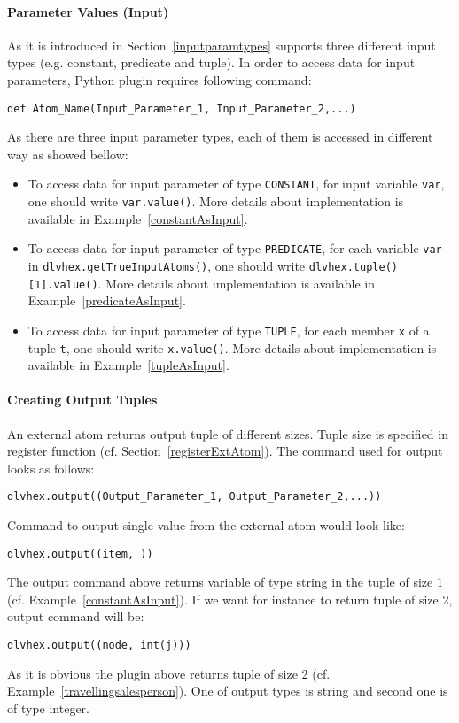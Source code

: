 \documentclass[a4paper, titlepage]{article}
\begin{document}
\paragraph{Parameter Values (Input)} As it is introduced in Section~\ref{inputparamtypes} \dlvhex{} supports three different input types (e.g. constant, predicate and tuple). In order to access data for input parameters, Python plugin requires following command:  
\begin{verbatim}
def Atom_Name(Input_Parameter_1, Input_Parameter_2,...)
\end{verbatim}
As there are three input parameter types, each of them is accessed in different way as showed bellow: 
\begin{itemize}
\item To access data for input parameter of type \verb+CONSTANT+, for input variable \verb+var+, one should write \verb+var.value()+. More details about implementation is available in Example~\ref{constantAsInput}.
 
\item To access data for input parameter of type \verb+PREDICATE+, for each variable \verb+var+ in \verb+dlvhex.getTrueInputAtoms()+, one should write \verb+dlvhex.tuple()[1].value()+. More details about implementation is available in Example~\ref{predicateAsInput}.  

\item To access data for input parameter of type \verb+TUPLE+, for each member \verb+x+ of a tuple \verb+t+, one should write \verb+x.value()+. More details about implementation is available in Example~\ref{tupleAsInput}.
\end{itemize}

\paragraph{Creating Output Tuples}
An external atom returns output tuple of different sizes. Tuple size is specified in register function (cf. Section~\ref{registerExtAtom}). The \dlvhex{} command used for output looks as follows: 
\begin{verbatim}
dlvhex.output((Output_Parameter_1, Output_Parameter_2,...))
\end{verbatim}
Command to output single value from the external atom would look like: 
\begin{verbatim}
dlvhex.output((item, ))
\end{verbatim}
The output command above returns variable of type string in the tuple of size 1 (cf. Example~\ref{constantAsInput}). 
If we want for instance to return tuple of size 2, output command will be:
\begin{verbatim}
dlvhex.output((node, int(j)))
\end{verbatim}
As it is obvious the plugin above returns tuple of size 2 (cf. Example~\ref{travellingsalesperson}). One of output types is string and second one is of type integer. 
\end{document}
